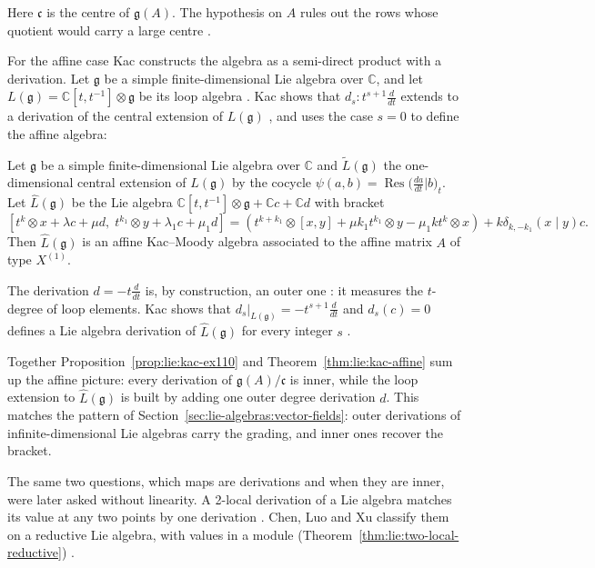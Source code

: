 Here $\mathfrak{c}$ is the centre of $\mathfrak{g}(A)$.  The hypothesis on
$A$ rules out the rows whose quotient would carry a large centre
\cite[Exercise~1.10, p.~11]{Kac1983}.

For the affine case Kac constructs the algebra as a semi-direct product
with a derivation.  Let $\mathfrak{g}$ be a simple finite-dimensional Lie
algebra over $\mathbb{C}$, and let
$L(\mathfrak{g})=\mathbb{C}[t,t^{-1}]\otimes\mathfrak{g}$ be its loop
algebra \cite[p.~74]{Kac1983}.  Kac shows that
$d_{s}\colon t^{s+1}\frac{d}{dt}$ extends to a derivation of the central
extension of $L(\mathfrak{g})$ \cite[Proposition~7.3, p.~74]{Kac1983}, and
uses the case $s=0$ to define the affine algebra:

\begin{theorem}\label{thm:lie:kac-affine}
Let $\mathfrak{g}$ be a simple finite-dimensional Lie algebra over
$\mathbb{C}$ and $\tilde{L}(\mathfrak{g})$ the one-dimensional central
extension of $L(\mathfrak{g})$ by the cocycle
$\psi(a,b)=\operatorname{Res}\big(\frac{da}{dt}|b\big)_{t}$.  Let
$\hat{L}(\mathfrak{g})$ be the Lie algebra
$\mathbb{C}[t,t^{-1}]\otimes\mathfrak{g}+\mathbb{C}c+\mathbb{C}d$
with bracket
\[
[t^{k}\!\otimes\!x+\lambda c+\mu d,\;t^{k_{1}}\!\otimes\!y+\lambda_{1}c+\mu_{1}d]
=(t^{k+k_{1}}\!\otimes\![x,y]+\mu k_{1}t^{k_{1}}\!\otimes\!y-\mu_{1}k t^{k}\!\otimes\!x)
+k\delta_{k,-k_{1}}(x\mid y)c.
\]
Then $\hat{L}(\mathfrak{g})$ is an affine Kac--Moody algebra associated
to the affine matrix $A$ of type $X^{(1)}$.
\end{theorem}

The derivation $d=-t\frac{d}{dt}$ is, by construction, an outer one
\cite[p.~74]{Kac1983}: it measures the $t$-degree of loop elements.
Kac shows that
$d_{s}|_{L(\mathfrak{g})}=-t^{s+1}\frac{d}{dt}$ and $d_{s}(c)=0$ defines
a Lie algebra derivation of $\hat{L}(\mathfrak{g})$ for every integer
$s$ \cite[Proposition~7.3, p.~74]{Kac1983}.

Together Proposition~\ref{prop:lie:kac-ex110} and
Theorem~\ref{thm:lie:kac-affine} sum up the affine picture: every
derivation of $\mathfrak{g}(A)/\mathfrak{c}$ is inner, while the loop
extension to $\hat{L}(\mathfrak{g})$ is built by adding one outer
degree derivation $d$.  This matches the pattern of
Section~\ref{sec:lie-algebras:vector-fields}: outer derivations of
infinite-dimensional Lie algebras carry the grading, and inner ones
recover the bracket.

The same two questions, which maps are derivations and when they are inner,
were later asked without linearity. A 2-local derivation of a Lie algebra
matches its value at any two points by one derivation
\cite[p.~1]{ChenLuoXu2026}. Chen, Luo and Xu classify them on a reductive
Lie algebra, with values in a module (Theorem~\ref{thm:lie:two-local-reductive}) \cite[p.~1]{ChenLuoXu2026}.


